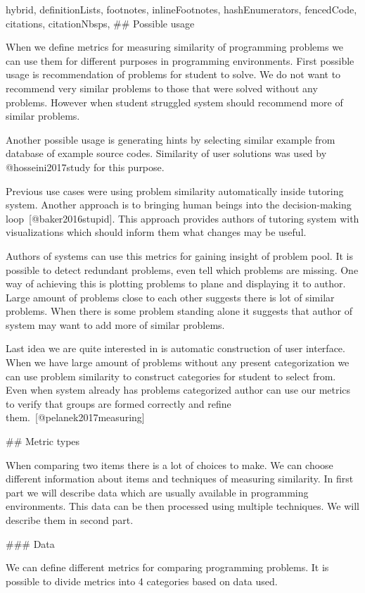 \documentclass[
  digital, %
  table,   %
  lof,     %
  lot,     %
]{fithesis3}
\begin{document}
\begin{markdown*}{%
  hybrid,
  definitionLists,
  footnotes,
  inlineFootnotes,
  hashEnumerators,
  fencedCode,
  citations,
  citationNbsps,
}
## Possible usage

When we define metrics for measuring similarity of programming problems we can use them for different purposes in programming environments. First possible usage is recommendation of problems for student to solve. We do not want to recommend very similar problems to those that were solved without any problems. However when student struggled system should recommend more of similar problems.

Another possible usage is generating hints by selecting similar example from database of example source codes. Similarity of user solutions was used by @hosseini2017study for this purpose.

Previous use cases were using problem similarity automatically inside tutoring system. Another approach is to bringing human beings into the decision-making loop~[@baker2016stupid]. This approach provides authors of tutoring system with visualizations which should inform them what changes may be useful.

Authors of systems can use this metrics for gaining insight of problem pool. It is possible to detect redundant problems, even tell which problems are missing. One way of achieving this is plotting problems to plane and displaying it to author. Large amount of problems close to each other suggests there is lot of similar problems. When there is some problem standing alone it suggests that author of system may want to add more of similar problems.

Last idea we are quite interested in is automatic construction of user interface. When we have large amount of problems without any present categorization we can use problem similarity to construct categories for student to select from. Even when system already has problems categorized author can use our metrics to verify that groups are formed correctly and refine them.~[@pelanek2017measuring]

## Metric types

When comparing two items there is a lot of choices to make. We can choose different information about items and techniques of measuring similarity. In first part we will describe data which are usually available in programming environments. This data can be then processed using multiple techniques. We will describe them in second part.

### Data

We can define different metrics for comparing programming problems. It is possible to divide metrics into 4 categories based on data used.


\end{markdown*}
\end{document}
